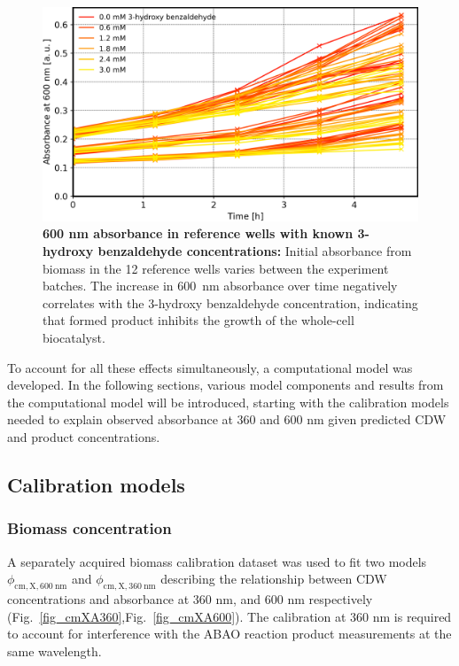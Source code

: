 \documentclass[sn-standardnature]{sn-jnl}%
\theoremstyle{thmstyleone}%
\theoremstyle{thmstyletwo}%
\theoremstyle{thmstylethree}%
\begin{document}
\begin{figure}[H]
    \centering
    \includegraphics[width=1.0\textwidth]{figures/plot_A600_kinetics.png}
    \caption{
        \textbf{600 nm absorbance in reference wells with known 3-hydroxy benzaldehyde concentrations:}
        Initial absorbance from biomass in the 12 reference wells varies between the experiment batches.
        The increase in 600~nm absorbance over time negatively correlates with the 3-hydroxy benzaldehyde concentration, indicating that formed product inhibits the growth of the whole-cell biocatalyst.
    }
    \label{fig_a600kinetics}
\end{figure}

To account for all these effects simultaneously, a computational model was developed.
In the following sections, various model components and results from the computational model will be introduced, starting with the calibration models needed to explain observed absorbance at 360 and 600 nm given predicted CDW and product concentrations.

\subsection{Calibration models}
\label{sec_calibrations}

\subsubsection{Biomass concentration}

A separately acquired biomass calibration dataset was used to fit two models $\phi_\mathrm{cm,X,600\ nm}$ and $\phi_\mathrm{cm,X,360\ nm}$ describing the relationship between CDW concentrations and absorbance at 360 nm, and 600 nm respectively (Fig.~\ref{fig_cmXA360},Fig.~\ref{fig_cmXA600}).
The calibration at 360 nm is required to account for interference with the ABAO reaction product measurements at the same wavelength.
\end{document}
